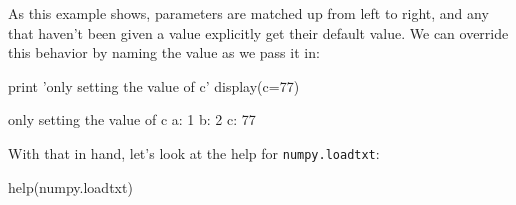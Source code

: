\documentclass{book}
\begin{document}
As this example shows, parameters are matched up from left to right, and
any that haven't been given a value explicitly get their default value.
We can override this behavior by naming the value as we pass it in:

\begin{VerbIn}
print 'only setting the value of c'
display(c=77)
\end{VerbIn}

\begin{VerbOut}
only setting the value of c
a: 1 b: 2 c: 77
\end{VerbOut}

With that in hand, let's look at the help for \texttt{numpy.loadtxt}:

\begin{VerbIn}
help(numpy.loadtxt)
\end{VerbIn}
\end{document}
